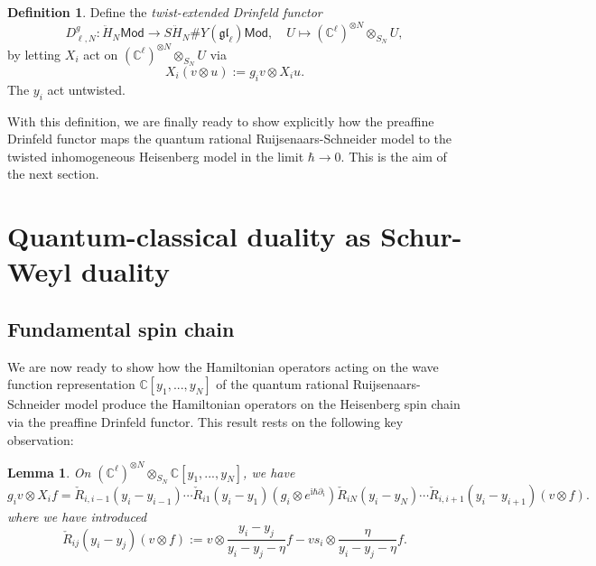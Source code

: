 \documentclass[11pt]{report}
\newtheorem{lemma}[theorem]{Lemma}
\theoremstyle{definition}
\newtheorem{definition}[theorem]{Definition}
\theoremstyle{remark}
\theoremstyle{remark}
\newcommand{\C}{\mathbb{C}}
\newcommand{\I}{\mathrm{i}}
\begin{document}
\begin{definition}
Define the \emph{twist-extended Drinfeld functor}
\begin{equation*}
D_{\ell,N}^g: \ddot H_N\mathsf{Mod} \to S\ddot H_N \# Y(\mathfrak{gl}_\ell)\mathsf{Mod}, \quad U \mapsto (\C^\ell)^{\otimes N} \otimes_{S_N} U,
\end{equation*}
by letting $X_i$ act on $(\C^\ell)^{\otimes N} \otimes_{S_N} U$ via
\begin{equation*}
X_i(v \otimes u) := g_i v \otimes X_i u.
\end{equation*}
The $y_i$ act untwisted.
\end{definition}

With this definition, we are finally ready to show explicitly how the preaffine Drinfeld functor maps the quantum rational Ruijsenaars-Schneider model to the twisted inhomogeneous Heisenberg model in the limit $\hbar \to 0$. This is the aim of the next section.

\section{Quantum-classical duality as Schur-Weyl duality}

\subsection{Fundamental spin chain}

We are now ready to show how the Hamiltonian operators acting on the wave function representation $\C[y_1,...,y_N]$ of the quantum rational Ruijsenaars-Schneider model produce the Hamiltonian operators on the Heisenberg spin chain via the preaffine Drinfeld functor. This result rests on the following key observation:

\begin{lemma}\label{lemma:keyLemma}
On $(\C^\ell)^{\otimes N} \otimes_{S_N} \C[y_1,...,y_N]$, we have
\begin{equation*}
g_i v \otimes X_i f = \check R_{i,i-1}(y_i-y_{i-1}) \cdots \check R_{i1}(y_i-y_1) (g_i \otimes e^{\I \hbar \partial_i}) \check R_{iN}(y_i-y_N) \cdots \check R_{i,i+1}(y_i-y_{i+1}) (v \otimes f).
\end{equation*}
where we have introduced
\begin{equation*}
\check R_{ij}(y_i-y_j) (v \otimes f) := v \otimes \frac{y_i-y_j}{y_i-y_j-\eta} f - v s_i \otimes \frac{\eta}{y_i-y_j-\eta} f.
\end{equation*}
\end{lemma}
\end{document}
